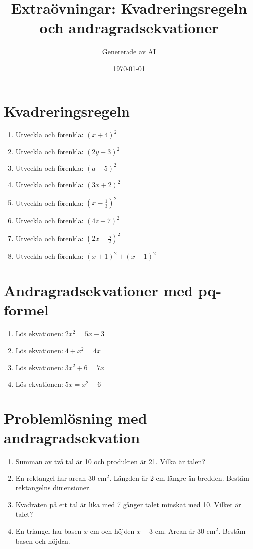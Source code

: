 \documentclass[a4paper,11pt]{article}
\title{Extraövningar: Kvadreringsregeln och andragradsekvationer}
\author{Genererade av AI}
\date{\today}
\begin{document}
\maketitle

\section{Kvadreringsregeln}
\begin{enumerate}[label=\textbf{\arabic*.}]
    \item Utveckla och förenkla: $(x+4)^2$
    \item Utveckla och förenkla: $(2y-3)^2$
    \item Utveckla och förenkla: $(a-5)^2$
    \item Utveckla och förenkla: $(3x+2)^2$
    \item Utveckla och förenkla: $(x-\frac{1}{3})^2$
    \item Utveckla och förenkla: $(4z+7)^2$
    \item Utveckla och förenkla: $(2x-\frac{5}{2})^2$
    \item Utveckla och förenkla: $(x+1)^2 + (x-1)^2$
\end{enumerate}

\section{Andragradsekvationer med pq-formel}
\begin{enumerate}[label=\textbf{\arabic*.}]
    \item Lös ekvationen: $2x^2 = 5x - 3$
    \item Lös ekvationen: $4 + x^2 = 4x$
    \item Lös ekvationen: $3x^2 + 6 = 7x$
    \item Lös ekvationen: $5x = x^2 + 6$
\end{enumerate}

\section{Problemlösning med andragradsekvation}
\begin{enumerate}[label=\textbf{\arabic*.}]
    \item Summan av två tal är 10 och produkten är 21. Vilka är talen?
    \item En rektangel har arean $30\text{ cm}^2$. Längden är 2 cm längre än bredden. Bestäm rektangelns dimensioner.
    \item Kvadraten på ett tal är lika med 7 gånger talet minskat med 10. Vilket är talet?
    \item En triangel har basen $x$ cm och höjden $x+3$ cm. Arean är $30\text{ cm}^2$. Bestäm basen och höjden.
\end{enumerate}
\end{document}
